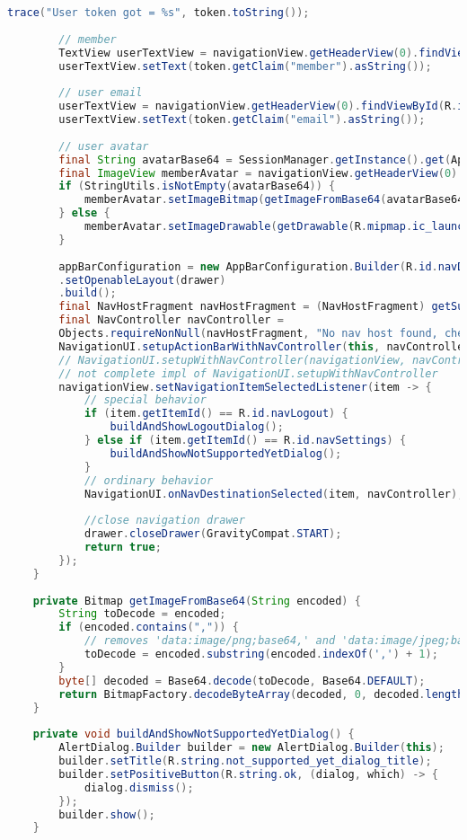 \begin{lstlisting}[language=Java]
		trace("User token got = %s", token.toString());
		
		// member
		TextView userTextView = navigationView.getHeaderView(0).findViewById(R.id.memberTextView);
		userTextView.setText(token.getClaim("member").asString());
		
		// user email
		userTextView = navigationView.getHeaderView(0).findViewById(R.id.memberEmailTextView);
		userTextView.setText(token.getClaim("email").asString());
		
		// user avatar
		final String avatarBase64 = SessionManager.getInstance().get(ApplicationContext.get(), MEMBER_AVATAR_STORED_KEY);
		final ImageView memberAvatar = navigationView.getHeaderView(0).findViewById(R.id.memberAvatar);
		if (StringUtils.isNotEmpty(avatarBase64)) {
			memberAvatar.setImageBitmap(getImageFromBase64(avatarBase64));
		} else {
			memberAvatar.setImageDrawable(getDrawable(R.mipmap.ic_launcher_round));
		}
		
		appBarConfiguration = new AppBarConfiguration.Builder(R.id.navDocsToSign, R.id.navDocsView, R.id.navCreateDoc)
		.setOpenableLayout(drawer)
		.build();
		final NavHostFragment navHostFragment = (NavHostFragment) getSupportFragmentManager().findFragmentById(R.id.navHostFragment);
		final NavController navController =
		Objects.requireNonNull(navHostFragment, "No nav host found, check configuration").getNavController();
		NavigationUI.setupActionBarWithNavController(this, navController, appBarConfiguration);
		// NavigationUI.setupWithNavController(navigationView, navController);
		// not complete impl of NavigationUI.setupWithNavController
		navigationView.setNavigationItemSelectedListener(item -> {
			// special behavior
			if (item.getItemId() == R.id.navLogout) {
				buildAndShowLogoutDialog();
			} else if (item.getItemId() == R.id.navSettings) {
				buildAndShowNotSupportedYetDialog();
			}
			// ordinary behavior
			NavigationUI.onNavDestinationSelected(item, navController);
			
			//close navigation drawer
			drawer.closeDrawer(GravityCompat.START);
			return true;
		});
	}
	
	private Bitmap getImageFromBase64(String encoded) {
		String toDecode = encoded;
		if (encoded.contains(",")) {
			// removes 'data:image/png;base64,' and 'data:image/jpeg;base64,'
			toDecode = encoded.substring(encoded.indexOf(',') + 1);
		}
		byte[] decoded = Base64.decode(toDecode, Base64.DEFAULT);
		return BitmapFactory.decodeByteArray(decoded, 0, decoded.length);
	}
	
	private void buildAndShowNotSupportedYetDialog() {
		AlertDialog.Builder builder = new AlertDialog.Builder(this);
		builder.setTitle(R.string.not_supported_yet_dialog_title);
		builder.setPositiveButton(R.string.ok, (dialog, which) -> {
			dialog.dismiss();
		});
		builder.show();
	}
	

\end{lstlisting}
